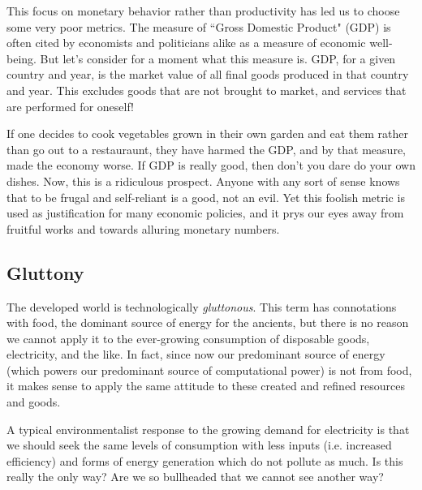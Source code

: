 \documentclass[letterpaper]{article}
\begin{document}
This focus on monetary behavior rather than productivity has led us to choose some very poor metrics. The measure of ``Gross Domestic Product" (GDP) is often cited by economists and politicians alike as a measure of economic well-being. But let's consider for a moment what this measure is. GDP, for a given country and year, is the market value of all final goods produced in that country and year. This excludes goods that are not brought to market, and services that are performed for oneself!

If one decides to cook vegetables grown in their own garden and eat them rather than go out to a restauraunt, they have harmed the GDP, and by that measure, made the economy worse. If GDP is really good, then don't you dare do your own dishes. Now, this is a ridiculous prospect. Anyone with any sort of sense knows that to be frugal and self-reliant is a good, not an evil. Yet this foolish metric is used as justification for many economic policies, and it prys our eyes away from fruitful works and towards alluring monetary numbers.


\iffalse
\subsection{Gnosticism}

Seeing these disconnecting patterns, the other heresy has become apparent in our times as well: the \textit{gnostic} heresy: that material things are flawed, evil, or are in some sense inauthentic or a distraction. These heretics have been throroughly rebuked by such saints as Irenaeus.
\fi

\subsection{Gluttony}

The developed world is technologically \textit{gluttonous}. This term has connotations with food, the dominant source of energy for the ancients, but there is no reason we cannot apply it to the ever-growing consumption of disposable goods, electricity, and the like. In fact, since now our predominant source of energy (which powers our predominant source of computational power) is not from food, it makes sense to apply the same attitude to these created and refined resources and goods.

A typical environmentalist response to the growing demand for electricity is that we should seek the same levels of consumption with less inputs (i.e. increased efficiency) and forms of energy generation which do not pollute as much. Is this really the only way? Are we so bullheaded that we cannot see another way?
\end{document}

